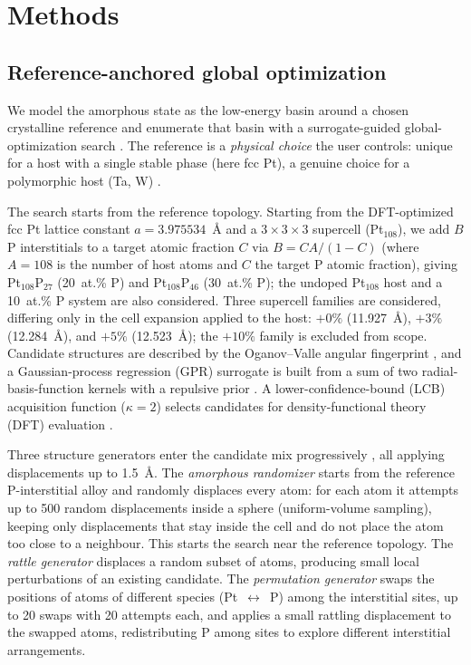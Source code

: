 
\section{Methods}\label{sec:methods}

\subsection{Reference-anchored global optimization}\label{sec:methods-search}

We model the amorphous state as the low-energy basin around a chosen
crystalline reference and enumerate that basin with a surrogate-guided
global-optimization search
\cite{gofee2020,gofee2022,agox2022}. The reference is a \emph{physical choice}
the user controls: unique for a host with a single stable phase (here fcc
Pt), a genuine choice for a polymorphic host (Ta, W)
\cite{colin2017,kozhukhovska2026,barmak2017,liubarmak2016,chattaraj2020}.

The search starts from the reference topology. Starting from the
DFT-optimized fcc Pt lattice constant $a = 3.975534$~\AA{} and a $3\times3\times3$
supercell (Pt$_{108}$), we add $B$ P interstitials to a target atomic fraction
$C$ via $B = C A / (1 - C)$ (where $A = 108$ is the number of host atoms and
$C$ the target P atomic fraction), giving Pt$_{108}$P$_{27}$ (20~at.\% P) and
Pt$_{108}$P$_{46}$ (30~at.\% P); the undoped Pt$_{108}$ host and a
10~at.\% P system are also considered. Three supercell families are considered,
differing only in the cell expansion applied to the host: $+0\%$
(11.927~\AA), $+3\%$ (12.284~\AA), and $+5\%$ (12.523~\AA); the $+10\%$
family is excluded from scope. Candidate structures are described by the
Oganov--Valle angular fingerprint \cite{oganov2009}, and a Gaussian-process
regression (GPR) surrogate is built from a sum of two radial-basis-function
kernels with a repulsive prior \cite{biswas2017,artrith2018}. A
lower-confidence-bound (LCB) acquisition function ($\kappa = 2$) selects
candidates for density-functional theory (DFT) evaluation \cite{gofee2022}.

Three structure generators enter the candidate mix progressively
\cite{agox2022}, all applying displacements up to 1.5~\AA{}. The
\emph{amorphous randomizer} starts from the reference P-interstitial alloy
and randomly displaces every atom: for each atom it attempts up to 500
random displacements inside a sphere (uniform-volume
sampling), keeping only displacements that stay inside the cell and do not
place the atom too close to a neighbour. This starts the search near the
reference topology. The \emph{rattle generator} displaces a random subset of
atoms, producing small local perturbations of an existing candidate. The
\emph{permutation generator} swaps the positions of atoms of
different species (Pt~$\leftrightarrow$~P) among the interstitial sites, up
to 20 swaps with 20 attempts each, and applies a small rattling displacement
to the swapped atoms, redistributing P among sites to explore different
interstitial arrangements.

